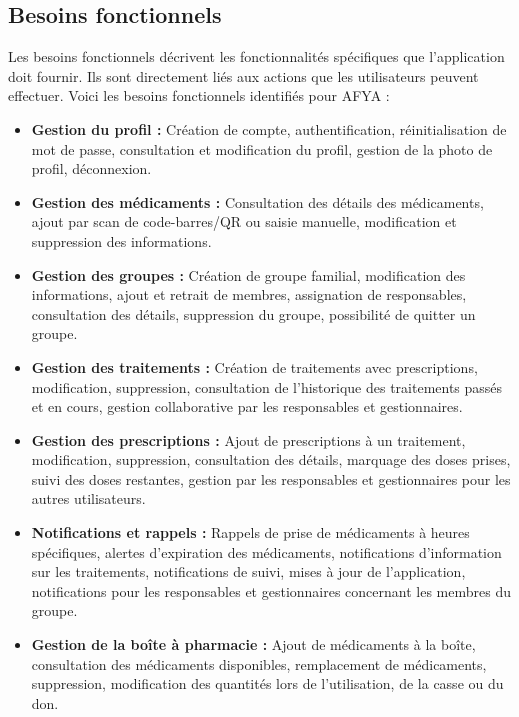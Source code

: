 \subsection{Besoins fonctionnels}
Les besoins fonctionnels décrivent les fonctionnalités spécifiques que l'application doit fournir. Ils sont directement liés aux actions que les utilisateurs peuvent effectuer. Voici les besoins fonctionnels identifiés pour AFYA :

\begin{itemize}
    \item \textbf{Gestion du profil :} Création de compte, authentification, réinitialisation de mot de passe, consultation et modification du profil, gestion de la photo de profil, déconnexion.

    \item \textbf{Gestion des médicaments :} Consultation des détails des médicaments, ajout par scan de code-barres/QR ou saisie manuelle, modification et suppression des informations.

    \item \textbf{Gestion des groupes :} Création de groupe familial, modification des informations, ajout et retrait de membres, assignation de responsables, consultation des détails, suppression du groupe, possibilité de quitter un groupe.

    \item \textbf{Gestion des traitements :} Création de traitements avec prescriptions, modification, suppression, consultation de l'historique des traitements passés et en cours, gestion collaborative par les responsables et gestionnaires.

    \item \textbf{Gestion des prescriptions :} Ajout de prescriptions à un traitement, modification, suppression, consultation des détails, marquage des doses prises, suivi des doses restantes, gestion par les responsables et gestionnaires pour les autres utilisateurs.

    \item \textbf{Notifications et rappels :} Rappels de prise de médicaments à heures spécifiques, alertes d'expiration des médicaments, notifications d'information sur les traitements, notifications de suivi, mises à jour de l'application, notifications pour les responsables et gestionnaires concernant les membres du groupe.

    \item \textbf{Gestion de la boîte à pharmacie :} Ajout de médicaments à la boîte, consultation des médicaments disponibles, remplacement de médicaments, suppression, modification des quantités lors de l'utilisation, de la casse ou du don.
\end{itemize}

